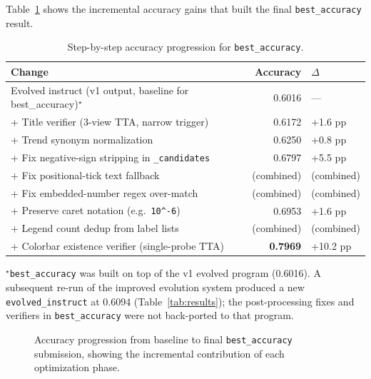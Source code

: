 \documentclass{article}
\begin{document}
Table~\ref{tab:progression} shows the incremental accuracy gains that built
the final \texttt{best\_accuracy} result.

\begin{table}[h]
\centering
\caption{Step-by-step accuracy progression for \texttt{best\_accuracy}.}
\label{tab:progression}
\begin{tabular}{lrl}
\toprule
Change & Accuracy & $\Delta$ \\
\midrule
Evolved instruct (v1 output, baseline for best\_accuracy)$^\star$ & 0.6016 & --- \\
+ Title verifier (3-view TTA, narrow trigger) & 0.6172 & +1.6 pp \\
+ Trend synonym normalization & 0.6250 & +0.8 pp \\
+ Fix negative-sign stripping in \texttt{\_candidates} & 0.6797 & +5.5 pp \\
+ Fix positional-tick text fallback & (combined) & (combined) \\
+ Fix embedded-number regex over-match & (combined) & (combined) \\
+ Preserve caret notation (e.g.\ \texttt{10\^{}-6}) & 0.6953 & +1.6 pp \\
+ Legend count dedup from label lists & (combined) & (combined) \\
+ Colorbar existence verifier (single-probe TTA) & \textbf{0.7969} & +10.2 pp \\
\bottomrule
\end{tabular}

\smallskip
{\small $^\star$\texttt{best\_accuracy} was built on top of the v1 evolved
program (0.6016). A subsequent re-run of the improved evolution system
produced a new \texttt{evolved\_instruct} at 0.6094
(Table~\ref{tab:results}); the post-processing fixes and verifiers in
\texttt{best\_accuracy} were not back-ported to that program.}
\end{table}

\begin{figure}[h]
\centering
{}
\caption{Accuracy progression from baseline to final \texttt{best\_accuracy}
submission, showing the incremental contribution of each optimization phase.}
\label{fig:progression}
\end{figure}
\end{document}
